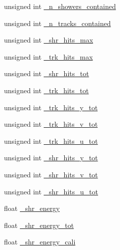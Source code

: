 \begin{DoxyCompactItemize}
\item 
unsigned int \hyperlink{classselection_1_1CC0piNpSelection_aebf4a69b8d7f3171ad90c382668c22ec}{\+\_\+n\+\_\+showers\+\_\+contained}
\item 
unsigned int \hyperlink{classselection_1_1CC0piNpSelection_a22c5cd4cf8882fa3cbabf25ed86d1f39}{\+\_\+n\+\_\+tracks\+\_\+contained}
\item 
unsigned int \hyperlink{classselection_1_1CC0piNpSelection_a750834ef52299d85f9596bbbafa1dffb}{\+\_\+shr\+\_\+hits\+\_\+max}
\item 
unsigned int \hyperlink{classselection_1_1CC0piNpSelection_a247d186cb641d28f8ea5b02c4f2a39bc}{\+\_\+trk\+\_\+hits\+\_\+max}
\item 
unsigned int \hyperlink{classselection_1_1CC0piNpSelection_aa6e7162371e3e343df001f0afc8a20b8}{\+\_\+shr\+\_\+hits\+\_\+tot}
\item 
unsigned int \hyperlink{classselection_1_1CC0piNpSelection_a420b9962478d7998282e03f1ccf89c2e}{\+\_\+trk\+\_\+hits\+\_\+tot}
\item 
unsigned int \hyperlink{classselection_1_1CC0piNpSelection_a76eb07fcb9190709464880c0ea7c4eba}{\+\_\+trk\+\_\+hits\+\_\+y\+\_\+tot}
\item 
unsigned int \hyperlink{classselection_1_1CC0piNpSelection_a30fe5ccb6a299f7955125aa6c9d5923d}{\+\_\+trk\+\_\+hits\+\_\+v\+\_\+tot}
\item 
unsigned int \hyperlink{classselection_1_1CC0piNpSelection_af7d0e867df8901ff3e531b4c1b96408a}{\+\_\+trk\+\_\+hits\+\_\+u\+\_\+tot}
\item 
unsigned int \hyperlink{classselection_1_1CC0piNpSelection_a6a43c3523af47860ad1682ebe14bb8e3}{\+\_\+shr\+\_\+hits\+\_\+y\+\_\+tot}
\item 
unsigned int \hyperlink{classselection_1_1CC0piNpSelection_ab6aaf4282fa9d2e5971e162c66901227}{\+\_\+shr\+\_\+hits\+\_\+v\+\_\+tot}
\item 
unsigned int \hyperlink{classselection_1_1CC0piNpSelection_afba4a31f84c2f125323b90f007bda1c6}{\+\_\+shr\+\_\+hits\+\_\+u\+\_\+tot}
\item 
float \hyperlink{classselection_1_1CC0piNpSelection_abf854f061d0476dc08ae8b3d71e7a86d}{\+\_\+shr\+\_\+energy}
\item 
float \hyperlink{classselection_1_1CC0piNpSelection_a6e42f011e79f646f36df7148907d1b59}{\+\_\+shr\+\_\+energy\+\_\+tot}
\item 
float \hyperlink{classselection_1_1CC0piNpSelection_a910f18dc66ac2f22aa8cbdd6b86c7d0e}{\+\_\+shr\+\_\+energy\+\_\+cali}
\item 

\end{DoxyCompactItemize}
